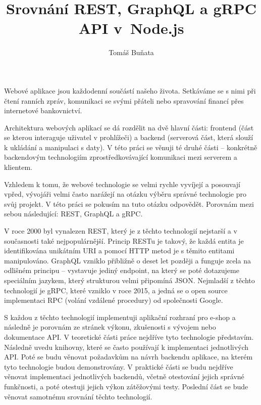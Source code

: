 \documentclass[thesis=M,czech]{FITthesis}[2019/12/23]
\title{Srovnání REST, GraphQL a gRPC API v~Node.js}
\author{Tomáš Buňata} %
\begin{document}

\begin{introduction}
Webové aplikace jsou každodenní součástí našeho života. Setkáváme se s nimi při čtení ranních zpráv, komunikaci se svými přáteli nebo spravování financí přes internetové bankovnictví.

Architektura webových aplikací se dá rozdělit na dvě hlavní části: frontend (část se kterou interaguje uživatel v prohlížeči) a backend (serverová část, která slouží k ukládání a manipulaci s daty). V této práci se věnuji té druhé části -- konkrétně backendovým technologiím zprostředkovávající komunikaci mezi serverem a klientem.

Vzhledem k tomu, že webové technologie se velmi rychle vyvíjejí a posouvají vpřed, vývojáři velmi často narážejí na otázku výběru správné technologie pro svůj projekt. V této práci se pokusím na tuto otázku odpovědět. Porovnám mezi sebou následující: REST, GraphQL a gRPC.

V roce 2000 byl vynalezen REST, který je z těchto technologií nejstarší a v současnosti také nejpopulárnější. Princip RESTu je takový, že každá entita je identifikována unikátním URI a pomocí HTTP metod je s těmito entitami manipulováno.
GraphQL vzniklo přibližně o deset let později a funguje zcela na odlišném principu -- vystavuje jediný endpoint, na který se poté dotazujeme speciálním jazykem, který strukturou velmi připomíná JSON.
Nejmladší z těchto technologií je gRPC, které vzniklo v roce 2015, a jedná se o open source implementaci RPC (volání vzdálené procedury) od společnosti Google.

S každou z těchto technologií implementuji aplikační rozhraní pro e-shop a následně je porovnám ze stránek výkonu, zkušenosti s vývojem nebo dokumentace API.
V teoretické části práce nejdříve tyto technologie představím. Následně uvedu knihovny, které se často používají k implementaci jednotlivých API. Poté se budu věnovat požadavkům na návrh backendu aplikace, na kterém tyto technologie budou demonstrovány.
V praktické části se budu nejdříve věnovat implementaci jednotlivých backendů, včetně otestování jejich správné funkčnosti, a poté otestuji jejich výkon zátěžovými testy. Poslední část se bude věnovat samotnému srovnání těchto technologií.

\end{introduction}
\end{document}
